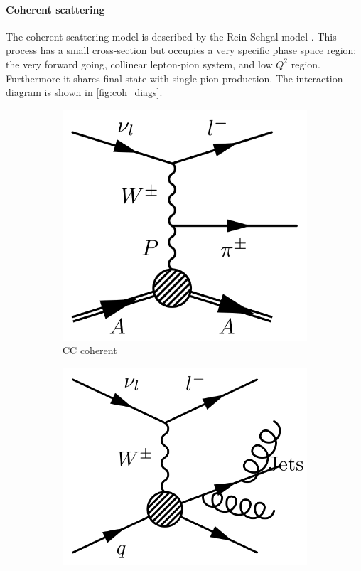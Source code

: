 \paragraph{Coherent scattering}
The coherent scattering model is described by the Rein-Sehgal model \cite{Rein_Sehgal_coh}. This process has a small cross-section but occupies a very specific phase space region: the very forward going, collinear lepton-pion system, and low $Q^2$ region. Furthermore it shares final state with single pion production. The interaction diagram is shown in \autoref{fig:coh_diags}.
\begin{figure}[h]
	\centering
	\begin{subfigure}[t]{0.42\textwidth}
		\includegraphics[width=\textwidth, trim={0mm 0mm 0mm 0mm}, clip,page=1]{figures/niwg/diagrams/CCcoh}
		\caption{CC coherent}
		\label{fig:coh_diags}
	\end{subfigure}
	\begin{subfigure}[t]{0.42\textwidth}
		\includegraphics[width=\textwidth, trim={0mm 0mm 0mm 0mm}, clip,page=1]{figures/niwg/diagrams/CCmultipion}

\end{subfigure}
\end{figure}
